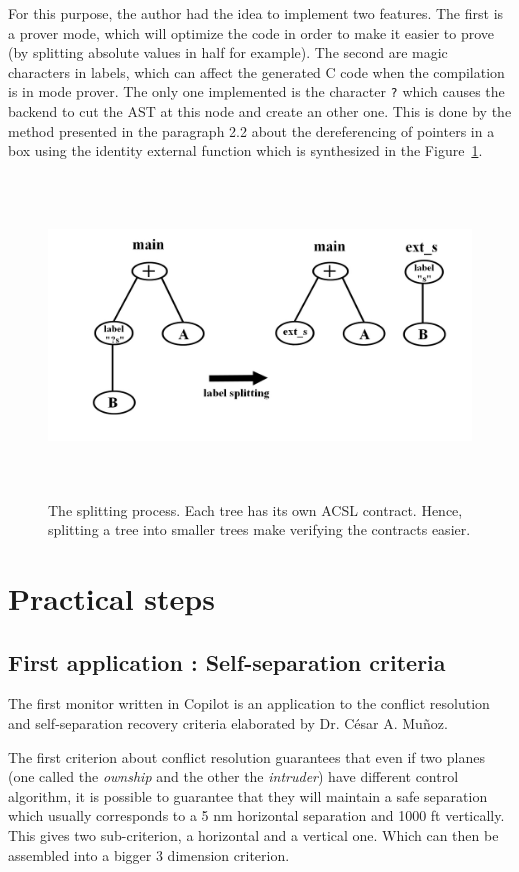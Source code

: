 \documentclass[a4paper,11pt,final]{article}
\begin{document}
  For this purpose, the author had the idea to implement two features. The first is a prover mode, which will optimize the code in order to make it easier to prove (by splitting absolute values in half for example). The second are magic characters in labels, which can affect the generated C code when the compilation is in mode prover. The only one implemented is the character \texttt{?} which causes the backend to cut the AST at this node and create an other one. This is done by the method presented in the paragraph 2.2 about the dereferencing of pointers in a box using the identity external function which is synthesized in the Figure~\ref{fig:splitting label}. 
  \begin{figure}
  	\includegraphics[height=85mm]{images/label splitting.jpg}
  	\caption{The splitting process. Each tree has its own ACSL contract. Hence, splitting a tree into smaller trees make verifying the contracts easier.}
  	\label{fig:splitting label}
  \end{figure}
  
  \section{Practical steps}
  \subsection{First application : Self-separation criteria}
  
  The first monitor written in Copilot is an application to the conflict resolution and self-separation recovery criteria elaborated by Dr. César A. Muñoz. 
  
  The first criterion about conflict resolution guarantees that even if two planes (one called the \emph{ownship} and the other the \emph{intruder}) have different control algorithm, it is possible to guarantee that they will maintain a safe separation which usually corresponds to a 5 nm horizontal separation and 1000 ft vertically. This gives two sub-criterion, a horizontal and a vertical one. Which can then be assembled into a bigger 3 dimension criterion.
  
\end{document}
